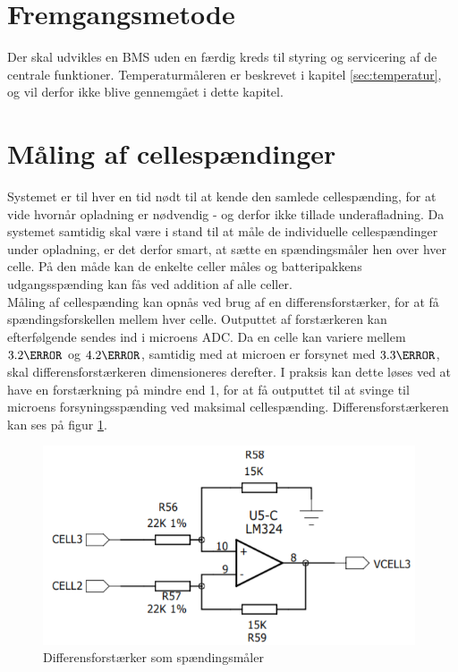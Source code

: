 \section{Fremgangsmetode}
Der skal udvikles en BMS uden en færdig kreds til styring og servicering af de centrale funktioner. Temperaturmåleren er beskrevet i kapitel \ref{sec:temperatur}, og vil derfor ikke blive gennemgået i dette kapitel.

\section{Måling af cellespændinger}
Systemet er til hver en tid nødt til at kende den samlede cellespænding, for at vide hvornår opladning er nødvendig - og derfor ikke tillade underafladning. Da systemet samtidig skal være i stand til at måle de individuelle cellespændinger under opladning, er det derfor smart, at sætte en spændingsmåler hen over hver celle. På den måde kan de enkelte celler måles og batteripakkens udgangsspænding kan fås ved addition af alle celler.
\\

Måling af cellespænding kan opnås ved brug af en differensforstærker, for at få spændingsforskellen mellem hver celle. Outputtet af forstærkeren kan efterfølgende sendes ind i microens ADC. Da en celle kan variere mellem $3.2\volt$ og $4.2\volt$, samtidig med at microen er forsynet med $3.3\volt$, skal differensforstærkeren dimensioneres derefter. I praksis kan dette løses ved at have en forstærkning på mindre end 1, for at få outputtet til at svinge til microens forsyningsspænding ved maksimal cellespænding. Differensforstærkeren kan ses på figur \ref{fig:cell_voltage}.
\\

\begin{figure}[h]
	\centering
	\includegraphics[width=11cm]{billeder/cell_voltage.png}
	\caption{Differensforstærker som spændingsmåler}
	\label{fig:cell_voltage}
\end{figure}

